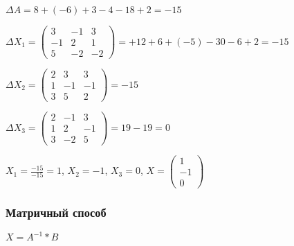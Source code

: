 \documentclass{article}
\begin{document}
\begin{flushleft}
\bigskip

$\Delta A = 8 + (-6) + 3 - 4 - 18 + 2 = -15$

$\Delta X_{1} = \begin{pmatrix}
    3 & -1 & 3 \\
    -1 & 2 & 1 \\
    5 & -2 & -2
\end{pmatrix} = +12 + 6 + (-5) - 30 - 6 + 2 = -15$

$\Delta X_{2} = \begin{pmatrix}
    2 & 3 & 3 \\
    1 & -1 & -1 \\
    3 & 5 & 2
\end{pmatrix} = -15$

$\Delta X_3 = \begin{pmatrix}
    2 & -1 & 3 \\
    1 & 2 & -1 \\
    3 & -2 & 5
\end{pmatrix} = 19 - 19 = 0$

$X_1 = \frac{-15}{-15} = 1$, $X_2 = -1$, $X_3 = 0$, $X = \begin{pmatrix}
    1 \\
    -1 \\
    0
\end{pmatrix}$

\end{flushleft}

\subsubsection{Матричный способ}

$X = A^{-1} * B$
\end{document}
